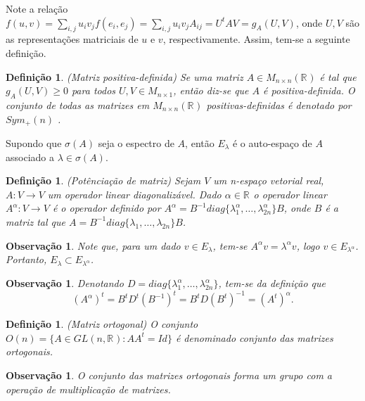 \documentclass[12pt]{book}
\newtheorem{definicao}[teorema]{Definição}
\newtheorem{observacao}[teorema]{Observação}
\newcommand{\autoespaco}[1]{E_{#1}}
\newcommand{\espectrooperador}[1]{\sigma(#1)}
\newcommand{\generalgroup}[2]{GL(#1, #2)}
\newcommand{\generalgroupreal}[1]{\generalgroup{#1}{\real{}}}
\newcommand{\matrizortogonal}[1]{O(#1)}
\newcommand{\matrizquadreal}[1]{M_{#1 \times #1}(\real{})}
\newcommand{\matrizsimetricapositiva}[1]{Sym_{+}(#1)}
\newcommand{\real}[1]{\mathbb{R}^{#1}}
\begin{document}
	Note a relação $f(u, v) = \sum_{i, j}u_{i}v_{j}f(e_{i}, e_{j}) = \sum_{i, j}u_{i}v_{j}A_{ij} = U^{t}AV = g_{A}(U, V)$, onde $U, V$ são as representações matriciais de $u$ e $v$, respectivamente. Assim, tem-se a seguinte definição.
	
	\begin{definicao}\label{definicao_matriz_positiva_definida}
		(Matriz positiva-definida) Se uma matriz $A \in \matrizquadreal{n}$ é tal que $g_{A}(U, V)\geq 0$ para todos $U,V \in M_{n\times 1}$, então diz-se que $A$ é positiva-definida. O conjunto de todas as matrizes em $\matrizquadreal{n}$ positivas-definidas é denotado por $\matrizsimetricapositiva{n}$ .
	\end{definicao}
	
	Supondo que $\espectrooperador{A}$ seja o espectro de $A$, então $\autoespaco{\lambda}$ é o auto-espaço de $A$ associado a $\lambda \in \espectrooperador{A}$.
	
	\begin{definicao}\label{definicao_potenciacao_matriz}
		(Potênciação de matriz) Sejam $V$ um n-espaço vetorial real, $A:V \to V$ um operador linear diagonalizável. Dado $\alpha \in \real{}$ o operador linear $A^{\alpha}:V \to V$ é o operador definido por $A^{\alpha} = B^{-1}diag\{ \lambda_{1}^{\alpha} , \dots, \lambda_{2n}^{\alpha} \}B$, onde $B$ é a matriz tal que $A= B^{-1}diag\{ \lambda_{1}, \dots, \lambda_{2n}\}B$.
	\end{definicao}
	
	\begin{observacao}
		Note que, para um dado $v \in E_{\lambda}$, tem-se $A^{\alpha}v = \lambda^{\alpha}v$, logo $v \in E_{\lambda^{\alpha}}$. Portanto, $E_{\lambda}\subset E_{\lambda^{\alpha}}$.
	\end{observacao}
	
	\begin{observacao}\label{observacao_transposta_potenciacao_matriz}
		Denotando $D = diag\{ \lambda_{1}^{\alpha} , \dots, \lambda_{2n}^{\alpha} \}$, tem-se da definição que
		$$
		(A^{\alpha})^{t} = B^{t}D^{t}(B^{-1})^{t} = B^{t}D(B^{t})^{-1} = (A^{t})^{\alpha}.
		$$
	\end{observacao}
	
	\begin{definicao}
		(Matriz ortogonal) O conjunto $\matrizortogonal{n} =\{ A \in \generalgroupreal{n}: AA^{t}=Id \}$ é denominado conjunto das matrizes ortogonais.
	\end{definicao}
	
	\begin{observacao}
		O conjunto das matrizes ortogonais forma um grupo com a operação de multiplicação de matrizes.
	\end{observacao}
	
\end{document}

